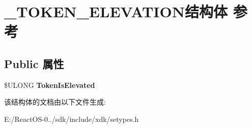 \hypertarget{struct___t_o_k_e_n___e_l_e_v_a_t_i_o_n}{}\section{\+\_\+\+T\+O\+K\+E\+N\+\_\+\+E\+L\+E\+V\+A\+T\+I\+O\+N结构体 参考}
\label{struct___t_o_k_e_n___e_l_e_v_a_t_i_o_n}
\subsection*{Public 属性}
\begin{DoxyCompactItemize}
\item 
\mbox{\label{struct___t_o_k_e_n___e_l_e_v_a_t_i_o_n_a8b4b5cf13bc6a9e264a302161bb59bae}} 
\$U\+L\+O\+NG {\bfseries Token\+Is\+Elevated}
\end{DoxyCompactItemize}


该结构体的文档由以下文件生成\+:\begin{DoxyCompactItemize}
\item 
E\+:/\+React\+O\+S-\/0../sdk/include/xdk/setypes.\+h\end{DoxyCompactItemize}
